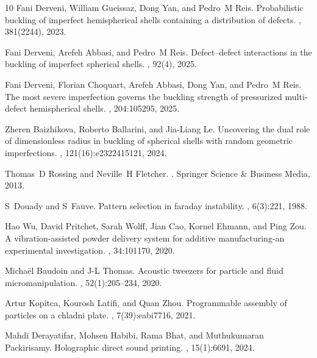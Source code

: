 \documentclass[twocolumn,letter,11pt]{article}
\begin{document}
\begin{thebibliography}{10}
Fani Derveni, William Gueissaz, Dong Yan, and Pedro~M Reis.
\newblock Probabilistic buckling of imperfect hemispherical shells containing a
  distribution of defects.
, 381(2244), 2023.

Fani Derveni, Arefeh Abbasi, and Pedro~M Reis.
\newblock Defect--defect interactions in the buckling of imperfect spherical
  shells.
, 92(4), 2025.

Fani Derveni, Florian Choquart, Arefeh Abbasi, Dong Yan, and Pedro~M Reis.
\newblock The most severe imperfection governs the buckling strength of
  pressurized multi-defect hemispherical shells.
, 204:105295, 2025.

Zheren Baizhikova, Roberto Ballarini, and Jia-Liang Le.
\newblock Uncovering the dual role of dimensionless radius in buckling of
  spherical shells with random geometric imperfections.
,
  121(16):e2322415121, 2024.

Thomas~D Rossing and Neville~H Fletcher.
.
\newblock Springer Science \& Business Media, 2013.

S~Douady and S~Fauve.
\newblock Pattern selection in faraday instability.
, 6(3):221, 1988.

Hao Wu, David Pritchet, Sarah Wolff, Jian Cao, Kornel Ehmann, and Ping Zou.
\newblock A vibration-assisted powder delivery system for additive
  manufacturing-an experimental investigation.
, 34:101170, 2020.

Micha{\"e}l Baudoin and J-L Thomas.
\newblock Acoustic tweezers for particle and fluid micromanipulation.
, 52(1):205--234, 2020.

Artur Kopitca, Kourosh Latifi, and Quan Zhou.
\newblock Programmable assembly of particles on a chladni plate.
, 7(39):eabi7716, 2021.

Mahdi Derayatifar, Mohsen Habibi, Rama Bhat, and Muthukumaran Packirisamy.
\newblock Holographic direct sound printing.
, 15(1):6691, 2024.


\end{thebibliography}
\end{document}
